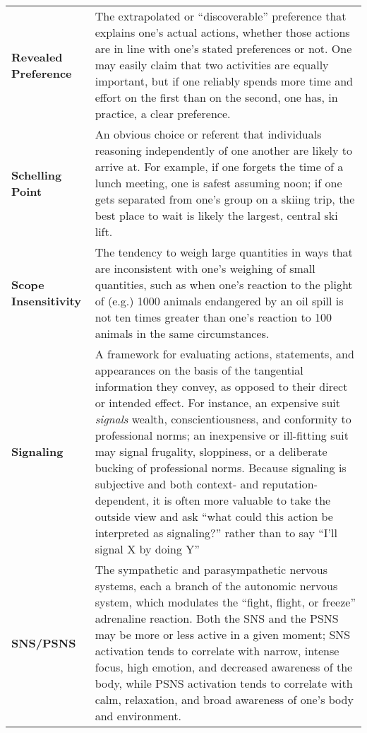 \begin{longtable} { p{} p{} }
\textbf{Revealed Preference} & The extrapolated or ``discoverable'' preference that explains one's actual actions, whether those actions are in line with one's stated preferences or not.  One may easily claim that two activities are equally important, but if one reliably spends more time and effort on the first than on the second, one has, in practice, a clear preference.\\

\textbf{Schelling Point} & An obvious choice or referent that individuals reasoning independently of one another are likely to arrive at.  For example, if one forgets the time of a lunch meeting, one is safest assuming noon; if one gets separated from one's group on a skiing trip, the best place to wait is likely the largest, central ski lift.\\

\textbf{Scope Insensitivity} & The tendency to weigh large quantities in ways that are inconsistent with one's weighing of small quantities, such as when one's reaction to the plight of (e.g.) 1000 animals endangered by an oil spill is not ten times greater than one's reaction to 100 animals in the same circumstances.\\

\textbf{Signaling} & A framework for evaluating actions, statements, and appearances on the basis of the tangential information they convey, as opposed to their direct or intended effect.  For instance, an expensive suit \emph{signals} wealth, conscientiousness, and conformity to professional norms; an inexpensive or ill-fitting suit may signal frugality, sloppiness, or a deliberate bucking of professional norms.  Because signaling is subjective and both context- and reputation-dependent, it is often more valuable to take the outside view and ask ``what could this action be interpreted as signaling?'' rather than to say ``I'll signal X by doing Y''\\

\textbf{SNS/PSNS} & The sympathetic and parasympathetic nervous systems, each a branch of the autonomic nervous system, which modulates the ``fight, flight, or freeze'' adrenaline reaction.  Both the SNS and the PSNS may be more or less active in a given moment; SNS activation tends to correlate with narrow, intense focus, high emotion, and decreased awareness of the body, while PSNS activation tends to correlate with calm, relaxation, and broad awareness of one's body and environment.\\


\end{longtable}
